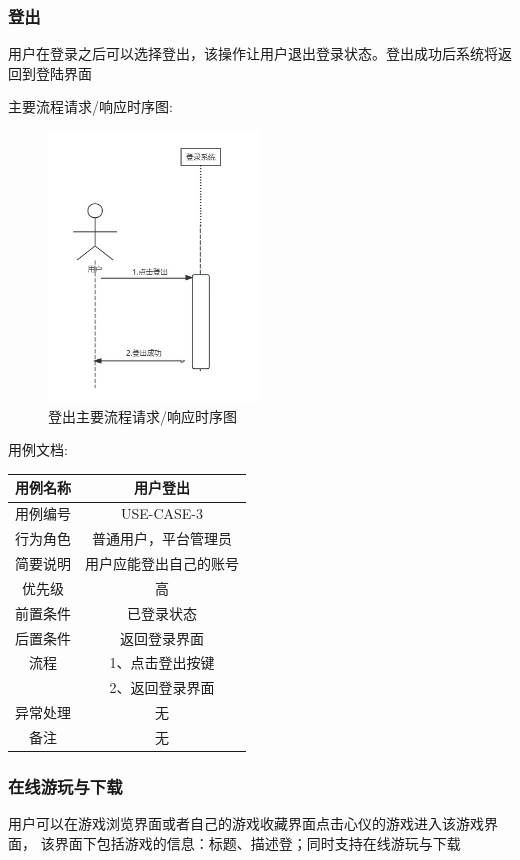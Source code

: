 \documentclass[12pt]{ctexart} %
\begin{document}
\subsubsection{登出}
用户在登录之后可以选择登出，该操作让用户退出登录状态。登出成功后系统将返回到登陆界面

主要流程请求/响应时序图:
\begin{figure}[h]
  \centering
  \includegraphics[width=0.5\textwidth]{yongli3.jpg}
  \caption{登出主要流程请求/响应时序图}
\end{figure}
用例文档:

\begin{tabular}{|c|c|}
  \hline
  用例名称& 用户登出\\
  \hline
  用例编号 & USE-CASE-3\\
  \hline
  行为角色 & 普通用户，平台管理员\\
  \hline
  简要说明 & 用户应能登出自己的账号\\
  \hline
  优先级 & 高\\
  \hline
  前置条件 & 已登录状态\\
  \hline
  后置条件 & 返回登录界面\\
  \hline
  流程 & 1、点击登出按键\\
      & 2、返回登录界面\\
  \hline
  异常处理 & 无\\
  \hline
  备注 & 无\\
  \hline
\end{tabular}

\subsubsection{在线游玩与下载}
用户可以在游戏浏览界面或者自己的游戏收藏界面点击心仪的游戏进入该游戏界面，
该界面下包括游戏的信息：标题、描述登；同时支持在线游玩与下载
\end{document}
